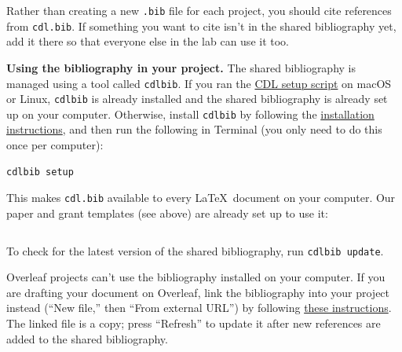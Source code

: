 \documentclass{tufte-book} %
\begin{document}
Rather than creating a new \texttt{.bib} file for each project, you
should cite references from \texttt{cdl.bib}.  If something you want
to cite isn't in the shared bibliography yet, add it there so that
everyone else in the lab can use it too.

\medskip
\noindent\textbf{Using the bibliography in your project.}  The shared
bibliography is managed using a tool called \texttt{cdlbib}.  If you
ran the \hyperref[sec:dev-environment]{CDL setup script} on macOS or
Linux, \texttt{cdlbib} is already installed and the shared
bibliography is already set up on your computer.  Otherwise, install
\texttt{cdlbib} by following the
\href{https://github.com/ContextLab/CDL-bibliography\#installation}{installation
  instructions}, and then run the following in Terminal (you only need
to do this once per computer):
\begin{verbatim}
cdlbib setup
\end{verbatim}
This makes \texttt{cdl.bib} available to every \LaTeX~document on your
computer.  Our paper and grant templates (see above) are already set
up to use it:
\begin{verbatim}

\end{verbatim}
To check for the latest version of the shared bibliography, run
\texttt{cdlbib update}.

Overleaf projects can't use the bibliography installed on your
computer.  If you are drafting your document on Overleaf, link the
bibliography into your project instead (``New file,'' then ``From
external URL'') by following
\href{https://github.com/ContextLab/CDL-bibliography\#using-the-bibtex-file-on-overleaf}{these
  instructions}.  The linked file is a copy; press ``Refresh'' to
update it after new references are added to the shared bibliography.
\end{document}
